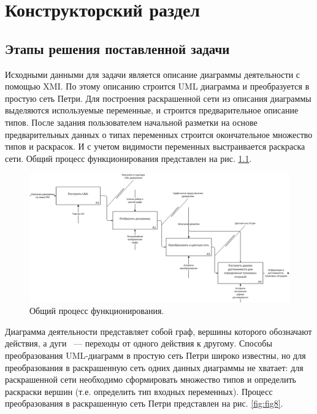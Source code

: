 \chapter{Конструкторский раздел}

\section{Этапы решения поставленной задачи}

Исходными данными для задачи является описание диаграммы деятельности с помощью XMI. По этому описанию строится UML диаграмма и преобразуется в простую сеть Петри. Для построения раскрашенной сети из описания диаграммы выделяются используемые переменные, и строится предварительное описание типов. После задания пользователем начальной разметки на основе предварительных данных о типах переменных строится окончательное множество типов и раскрасок. И с учетом видимости переменных выстраивается раскраска сети. Общий процесс функционирования представлен на рис. \ref{fig:fig7}. 

\begin{figure}
	\begin{center}
		\includegraphics[width=\textwidth]{include/IDEF0.png}
	\end{center}
	\caption{Общий процесс функционирования.}
	\label{fig:fig7}
\end{figure}

Диаграмма деятельности представляет собой граф, вершины которого обозначают действия, а дуги ~--- переходы от одного действия к другому. Способы преобразования UML-диаграмм в простую сеть Петри широко известны, но для преобразования в раскрашенную сеть одних данных диаграммы не хватает: для раскрашенной сети необходимо сформировать множество типов и определить раскраски вершин (т.е. определить тип входных переменных). Процесс преобразования в раскрашенную сеть Петри представлен на рис. \ref{fig:fig8}.

